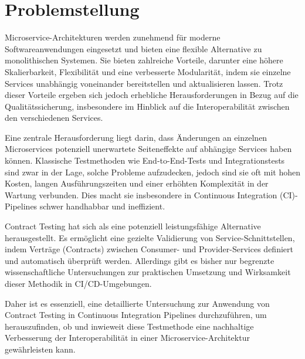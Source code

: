 \chapter{Problemstellung}\label{ch:intro}


Microservice-Architekturen werden zunehmend für moderne Softwareanwendungen eingesetzt und bieten eine flexible Alternative zu monolithischen Systemen.
Sie bieten zahlreiche Vorteile, darunter eine höhere Skalierbarkeit, Flexibilität und eine verbesserte Modularität, indem sie einzelne Services unabhängig voneinander bereitstellen und aktualisieren lassen.
Trotz dieser Vorteile ergeben sich jedoch erhebliche Herausforderungen in Bezug auf die Qualitätssicherung, insbesondere im Hinblick auf die Interoperabilität zwischen den verschiedenen Services.

Eine zentrale Herausforderung liegt darin, dass Änderungen an einzelnen Microservices potenziell unerwartete Seiteneffekte auf abhängige Services haben können.
Klassische Testmethoden wie End-to-End-Tests und Integrationstests sind zwar in der Lage, solche Probleme aufzudecken, jedoch sind sie oft mit hohen Kosten, langen Ausführungszeiten und einer erhöhten Komplexität in der Wartung verbunden.
Dies macht sie insbesondere in Continuous Integration (CI)-Pipelines schwer handhabbar und ineffizient.

Contract Testing hat sich als eine potenziell leistungsfähige Alternative herausgestellt.
Es ermöglicht eine gezielte Validierung von Service-Schnittstellen, indem Verträge (Contracts) zwischen Consumer- und Provider-Services definiert und automatisch überprüft werden.
Allerdings gibt es bisher nur begrenzte wissenschaftliche Untersuchungen zur praktischen Umsetzung und Wirksamkeit dieser Methodik in CI/CD-Umgebungen.

Daher ist es essenziell, eine detaillierte Untersuchung zur Anwendung von Contract Testing in Continuous Integration Pipelines durchzuführen, um herauszufinden, ob und inwieweit diese Testmethode eine nachhaltige Verbesserung der Interoperabilität in einer Microservice-Architektur gewährleisten kann.

